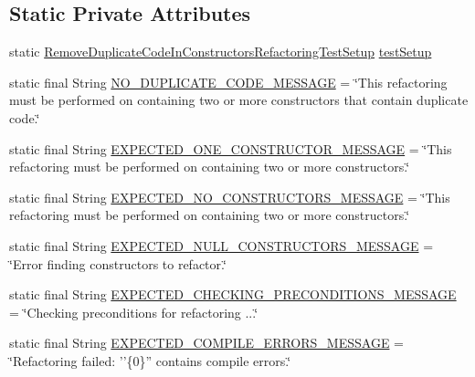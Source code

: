 \subsection*{Static Private Attributes}
\begin{DoxyCompactItemize}
\item 
static \hyperlink{classedu_1_1illinois_1_1canistelCassabanana_1_1tests_1_1RemoveDuplicateCodeInConstructorsRefactoringTestSetup}{RemoveDuplicateCodeInConstructorsRefactoringTestSetup} \hyperlink{classedu_1_1illinois_1_1canistelCassabanana_1_1tests_1_1RemoveDuplicateCodeInConstructorsRefactoringTests_a59cc4d65c71cfb08779284c46cb56d3e}{testSetup}
\item 
static final String \hyperlink{classedu_1_1illinois_1_1canistelCassabanana_1_1tests_1_1RemoveDuplicateCodeInConstructorsRefactoringTests_afbc679d5c59bbc0ffc5582ce412a2492}{NO\_\-DUPLICATE\_\-CODE\_\-MESSAGE} = \char`\"{}This refactoring must be performed on containing two or more constructors that contain duplicate code.\char`\"{}
\item 
static final String \hyperlink{classedu_1_1illinois_1_1canistelCassabanana_1_1tests_1_1RemoveDuplicateCodeInConstructorsRefactoringTests_a6d44de9379cb26439ffd7e2ff29e5874}{EXPECTED\_\-ONE\_\-CONSTRUCTOR\_\-MESSAGE} = \char`\"{}This refactoring must be performed on containing two or more constructors.\char`\"{}
\item 
static final String \hyperlink{classedu_1_1illinois_1_1canistelCassabanana_1_1tests_1_1RemoveDuplicateCodeInConstructorsRefactoringTests_ab3af05be15455583ceda71e6a6587049}{EXPECTED\_\-NO\_\-CONSTRUCTORS\_\-MESSAGE} = \char`\"{}This refactoring must be performed on containing two or more constructors.\char`\"{}
\item 
static final String \hyperlink{classedu_1_1illinois_1_1canistelCassabanana_1_1tests_1_1RemoveDuplicateCodeInConstructorsRefactoringTests_a1a017b7b7c8607561e8f93423b10b0e0}{EXPECTED\_\-NULL\_\-CONSTRUCTORS\_\-MESSAGE} = \char`\"{}Error finding constructors to refactor.\char`\"{}
\item 
static final String \hyperlink{classedu_1_1illinois_1_1canistelCassabanana_1_1tests_1_1RemoveDuplicateCodeInConstructorsRefactoringTests_a734c5cd6b9cd1e88c2ab61ae597d66a8}{EXPECTED\_\-CHECKING\_\-PRECONDITIONS\_\-MESSAGE} = \char`\"{}Checking preconditions for refactoring ...\char`\"{}
\item 
static final String \hyperlink{classedu_1_1illinois_1_1canistelCassabanana_1_1tests_1_1RemoveDuplicateCodeInConstructorsRefactoringTests_a926cb04d4eaedbbf59ba8d0220147ec5}{EXPECTED\_\-COMPILE\_\-ERRORS\_\-MESSAGE} = \char`\"{}Refactoring failed: ''\{0\}'' contains compile errors.\char`\"{}

\end{DoxyCompactItemize}
